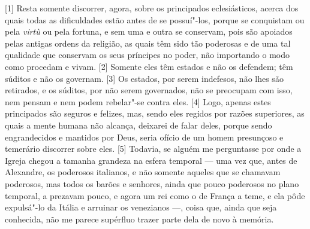 
{[}1{]} Resta somente discorrer, agora, sobre os principados
eclesiásticos, acerca dos quais todas as dificuldades estão antes de se
possuí"-los, porque se conquistam ou pela \emph{virtù} ou pela fortuna, e
sem uma e outra se conservam, pois são apoiados pelas antigas ordens da
religião, as quais têm sido tão poderosas e de uma tal qualidade que
conservam os seus príncipes no poder, não importando o modo como
procedam e vivam. {[}2{]} Somente eles têm estados e não os defendem;
têm súditos e não os governam. {[}3{]} Os estados, por serem indefesos,
não lhes são retirados, e os súditos, por não serem governados, não se
preocupam com isso, nem pensam e nem podem rebelar"-se contra eles.
{[}4{]} Logo, apenas estes principados são seguros e felizes, mas, sendo
eles regidos por razões superiores, as quais a mente humana não alcança,
deixarei de falar deles, porque sendo engrandecidos e mantidos por Deus,
seria ofício de um homem presunçoso e temerário discorrer sobre eles.
{[}5{]} Todavia, se
alguém me perguntasse por onde a Igreja chegou a tamanha grandeza na
esfera temporal --- uma vez que, antes de Alexandre, os poderosos italianos, e não somente aqueles que se
chamavam poderosos, mas todos os barões e senhores, ainda que pouco
poderosos no plano temporal, a prezavam pouco, e agora um rei como o de
França a teme, e ela pôde expulsá"-lo da Itália e arruinar os venezianos
---, coisa que, ainda que seja conhecida, não me parece supérfluo trazer
parte dela de novo à memória.

